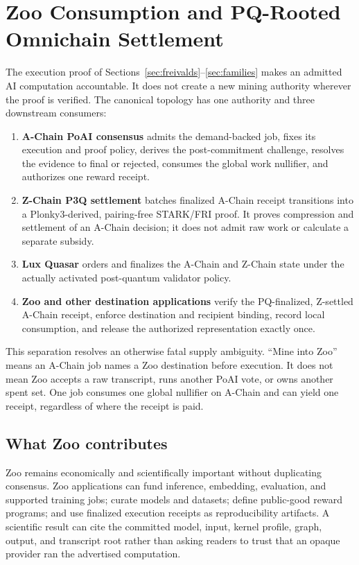 \section{Zoo Consumption and PQ-Rooted Omnichain Settlement}
\label{sec:l3-settlement}

The execution proof of Sections~\ref{sec:freivalds}--\ref{sec:families} makes an admitted
AI computation accountable. It does not create a new mining authority wherever the proof
is verified. The canonical topology has one authority and three downstream consumers:

\begin{enumerate}[leftmargin=1.4em]
\item \textbf{A-Chain PoAI consensus} admits the demand-backed job, fixes its execution
and proof policy, derives the post-commitment challenge, resolves the evidence to final or
rejected, consumes the global work nullifier, and authorizes one reward receipt.
\item \textbf{Z-Chain P3Q settlement} batches finalized A-Chain receipt transitions into a
Plonky3-derived, pairing-free STARK/FRI proof. It proves compression and settlement of an
A-Chain decision; it does not admit raw work or calculate a separate subsidy.
\item \textbf{Lux Quasar} orders and finalizes the A-Chain and Z-Chain state under the
actually activated post-quantum validator policy.
\item \textbf{Zoo and other destination applications} verify the PQ-finalized, Z-settled
A-Chain receipt, enforce destination and recipient binding, record local consumption, and
release the authorized representation exactly once.
\end{enumerate}

This separation resolves an otherwise fatal supply ambiguity. ``Mine into Zoo'' means an
A-Chain job names a Zoo destination before execution. It does not mean Zoo accepts a raw
transcript, runs another PoAI vote, or owns another spent set. One job consumes one global
nullifier on A-Chain and can yield one receipt, regardless of where the receipt is paid.

\subsection{What Zoo contributes}

Zoo remains economically and scientifically important without duplicating consensus. Zoo
applications can fund inference, embedding, evaluation, and supported training jobs; curate
models and datasets; define public-good reward programs; and use finalized execution
receipts as reproducibility artifacts. A scientific result can cite the committed model,
input, kernel profile, graph, output, and transcript root rather than asking readers to
trust that an opaque provider ran the advertised computation.

